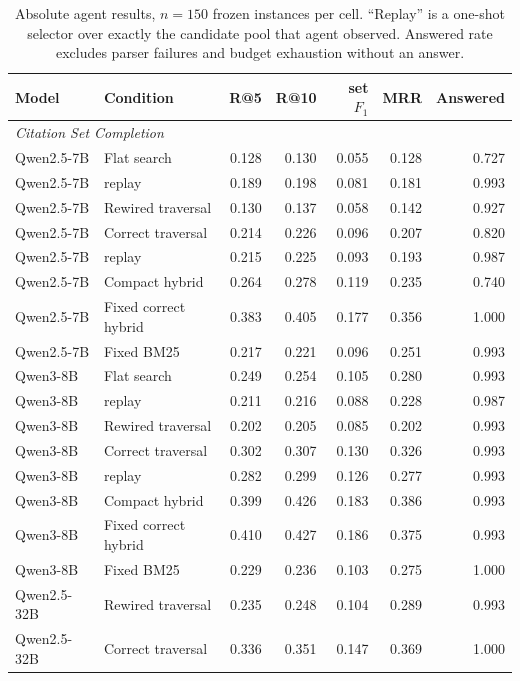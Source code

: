 \begin{table}[t]
\centering
\small
\caption{Absolute agent results, $n{=}150$ frozen instances per cell. ``Replay'' is a one-shot
selector over exactly the candidate pool that agent observed. Answered rate excludes parser
failures and budget exhaustion without an answer.}
\label{tab:ar-agent-abs}
\begin{tabular}{llrrrrr}
\toprule
Model & Condition & R@5 & R@10 & set $F_1$ & MRR & Answered \\
\midrule
\multicolumn{7}{l}{\emph{Citation Set Completion}} \\
Qwen2.5-7B & Flat search & 0.128 & 0.130 & 0.055 & 0.128 & 0.727 \\
Qwen2.5-7B & \quad replay & 0.189 & 0.198 & 0.081 & 0.181 & 0.993 \\
Qwen2.5-7B & Rewired traversal & 0.130 & 0.137 & 0.058 & 0.142 & 0.927 \\
Qwen2.5-7B & Correct traversal & 0.214 & 0.226 & 0.096 & 0.207 & 0.820 \\
Qwen2.5-7B & \quad replay & 0.215 & 0.225 & 0.093 & 0.193 & 0.987 \\
Qwen2.5-7B & Compact hybrid & 0.264 & 0.278 & 0.119 & 0.235 & 0.740 \\
Qwen2.5-7B & Fixed correct hybrid & 0.383 & 0.405 & 0.177 & 0.356 & 1.000 \\
Qwen2.5-7B & Fixed BM25 & 0.217 & 0.221 & 0.096 & 0.251 & 0.993 \\
\addlinespace
Qwen3-8B & Flat search & 0.249 & 0.254 & 0.105 & 0.280 & 0.993 \\
Qwen3-8B & \quad replay & 0.211 & 0.216 & 0.088 & 0.228 & 0.987 \\
Qwen3-8B & Rewired traversal & 0.202 & 0.205 & 0.085 & 0.202 & 0.993 \\
Qwen3-8B & Correct traversal & 0.302 & 0.307 & 0.130 & 0.326 & 0.993 \\
Qwen3-8B & \quad replay & 0.282 & 0.299 & 0.126 & 0.277 & 0.993 \\
Qwen3-8B & Compact hybrid & 0.399 & 0.426 & 0.183 & 0.386 & 0.993 \\
Qwen3-8B & Fixed correct hybrid & 0.410 & 0.427 & 0.186 & 0.375 & 0.993 \\
Qwen3-8B & Fixed BM25 & 0.229 & 0.236 & 0.103 & 0.275 & 1.000 \\
\addlinespace
Qwen2.5-32B & Rewired traversal & 0.235 & 0.248 & 0.104 & 0.289 & 0.993 \\
Qwen2.5-32B & Correct traversal & 0.336 & 0.351 & 0.147 & 0.369 & 1.000 \\
\bottomrule
\end{tabular}
\end{table}

